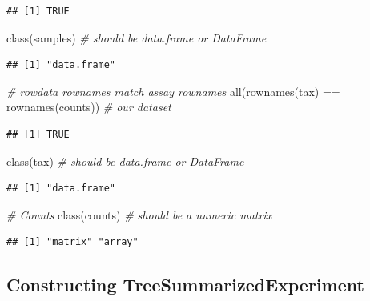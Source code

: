 \documentclass[
]{book}
\newenvironment{Shaded}{\begin{snugshade}}{\end{snugshade}}
\newcommand{\CommentTok}[1]{\textcolor[rgb]{0.56,0.35,0.01}{\textit{#1}}}
\newcommand{\FunctionTok}[1]{\textcolor[rgb]{0.00,0.00,0.00}{#1}}
\newcommand{\NormalTok}[1]{#1}
\newcommand{\SpecialCharTok}[1]{\textcolor[rgb]{0.00,0.00,0.00}{#1}}
\begin{document}
\begin{verbatim}
## [1] TRUE
\end{verbatim}

\begin{Shaded}
\begin{Highlighting}[]
\FunctionTok{class}\NormalTok{(samples) }\CommentTok{\# should be data.frame or DataFrame}
\end{Highlighting}
\end{Shaded}

\begin{verbatim}
## [1] "data.frame"
\end{verbatim}

\begin{Shaded}
\begin{Highlighting}[]
\CommentTok{\# rowdata rownames match assay rownames}
\FunctionTok{all}\NormalTok{(}\FunctionTok{rownames}\NormalTok{(tax) }\SpecialCharTok{==} \FunctionTok{rownames}\NormalTok{(counts)) }\CommentTok{\# our dataset}
\end{Highlighting}
\end{Shaded}

\begin{verbatim}
## [1] TRUE
\end{verbatim}

\begin{Shaded}
\begin{Highlighting}[]
\FunctionTok{class}\NormalTok{(tax) }\CommentTok{\# should be data.frame or DataFrame}
\end{Highlighting}
\end{Shaded}

\begin{verbatim}
## [1] "data.frame"
\end{verbatim}

\begin{Shaded}
\begin{Highlighting}[]
\CommentTok{\# Counts }
\FunctionTok{class}\NormalTok{(counts) }\CommentTok{\# should be a numeric matrix}
\end{Highlighting}
\end{Shaded}

\begin{verbatim}
## [1] "matrix" "array"
\end{verbatim}

\hypertarget{constructing-treesummarizedexperiment}{%
\subsection{Constructing TreeSummarizedExperiment}\label{constructing-treesummarizedexperiment}}
\end{document}
